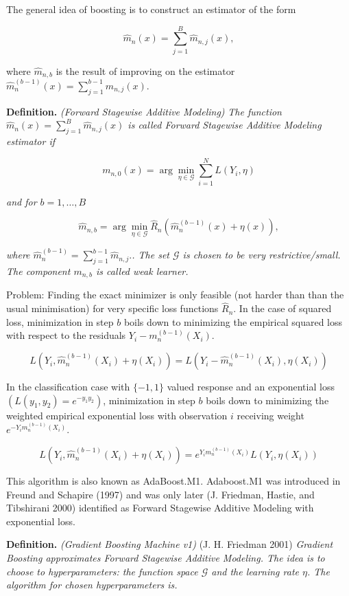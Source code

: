 \documentclass[a4paper,10pt,openany]{book}
\begin{document}
The general idea of boosting is to construct an estimator of the form

\[
\hat m_n(x)=\sum_{j=1}^B \hat m_{n,j}(x),
\]

where \(\hat m_{n,b}\) is the result of improving on the estimator \(\hat m_n^{(b-1)}(x)=\sum_{j=1}^{b-1} \hat m_{n,j}(x)\).

\textbf{Definition.} \emph{(Forward Stagewise Additive Modeling)} \emph{The function \(\hat m_n(x)=\sum_{j=1}^B \hat m_{n,j}(x)\) is called Forward Stagewise Additive Modeling estimator if}

\[
m_{n,0}(x)=\arg \min_{\eta\in \mathcal G} \sum_{i=1}^N L\left(Y_i, \eta\right)
\]

\emph{and for \(b=1,\dots,B\)}

\[
\hat m_{n,b} =  \arg \min_{\eta\in \mathcal G} \hat R_n\left( \hat m_n^{(b-1)}(x)+\eta(x)\right),
\]

\emph{where \(\hat m_n^{(b-1)}=\sum_{j=1}^{b-1}\hat m_{n,j}.\). The set \(\mathcal G\) is chosen to be very restrictive/small. The component \(m_{n,b}\) is called weak learner.}

Problem: Finding the exact minimizer is only feasible (not harder than than the usual minimisation) for very specific loss functions \(\hat R_n\). In the case of squared loss, minimization in step \(b\) boils down to minimizing the empirical squared loss with respect to the residuals \(Y_i- m_n^{(b-1)}(X_i)\).

\[
L\left(Y_i, \hat m_n^{(b-1)}(X_i)+\eta(X_i)\right)=L\left(Y_i-\hat m_n^{(b-1)}(X_i),\eta(X_i)\right)
\]

In the classification case with \(\{-1,1\}\) valued response and an exponential loss \((L(y_1,y_2)=e^{-y_1y_2})\), minimization in step \(b\) boils down to minimizing the weighted empirical exponential loss with observation \(i\) receiving weight \(e^{-Y_im_n^{(b-1)}(X_i)}\).

\[
L\left(Y_i,  \hat m_n^{(b-1)}(X_i)+\eta(X_i)\right)=e^{Y_im_n^{(b-1)}(X_i)}L\left(Y_i,\eta(X_i)\right)
\]

This algorithm is also known as AdaBoost.M1. Adaboost.M1 was introduced in Freund and Schapire (1997) and was only later (J. Friedman, Hastie, and Tibshirani 2000) identified as Forward Stagewise Additive Modeling with exponential loss.

\textbf{Definition.} \emph{(Gradient Boosting Machine v1)} (J. H. Friedman 2001) \emph{Gradient Boosting approximates Forward Stagewise Additive Modeling. The idea is to choose to hyperparameters: the function space \(\mathcal G\) and the learning rate \(\eta\). The algorithm for chosen hyperparameters is.}
\end{document}
